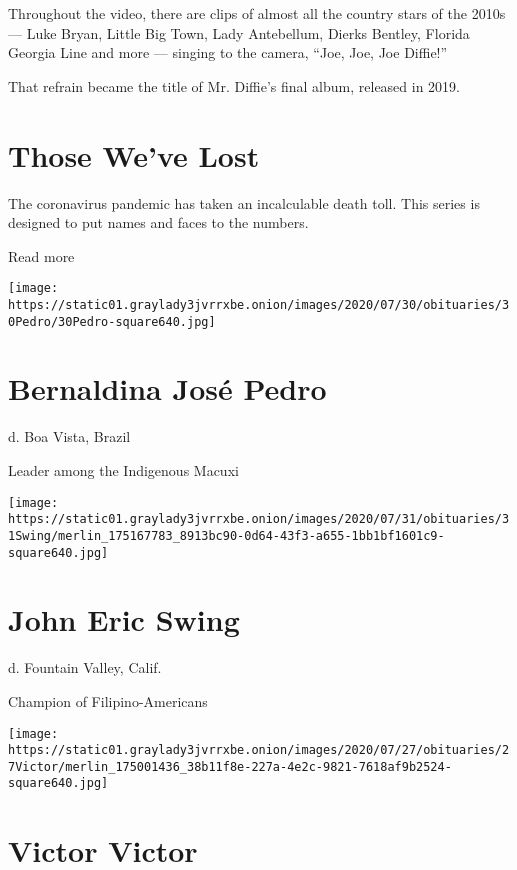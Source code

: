 Throughout the video, there are clips of almost all the country stars of
the 2010s --- Luke Bryan, Little Big Town, Lady Antebellum, Dierks
Bentley, Florida Georgia Line and more --- singing to the camera, ``Joe,
Joe, Joe Diffie!''

That refrain became the title of Mr. Diffie's final album, released in
2019.

\href{https://www.nytimes3xbfgragh.onion/interactive/2020/obituaries/people-died-coronavirus-obituaries.html?action=click\&pgtype=Article\&state=default\&region=BELOW_MAIN_CONTENT\&context=covid_obits_promo}{}

\hypertarget{those-weve-lost}{%
\section{Those We've Lost}\label{those-weve-lost}}

The coronavirus pandemic has taken an incalculable death toll. This
series is designed to put names and faces to the numbers.

Read more

\texttt{[image: https://static01.graylady3jvrrxbe.onion/images/2020/07/30/obituaries/30Pedro/30Pedro-square640.jpg]}

\hypertarget{bernaldina-josuxe9-pedro}{%
\section{Bernaldina José Pedro}\label{bernaldina-josuxe9-pedro}}

d. Boa Vista, Brazil

Leader among the Indigenous Macuxi

\texttt{[image: https://static01.graylady3jvrrxbe.onion/images/2020/07/31/obituaries/31Swing/merlin\_175167783\_8913bc90-0d64-43f3-a655-1bb1bf1601c9-square640.jpg]}

\hypertarget{john-eric-swing}{%
\section{John Eric Swing}\label{john-eric-swing}}

d. Fountain Valley, Calif.

Champion of Filipino-Americans

\texttt{[image: https://static01.graylady3jvrrxbe.onion/images/2020/07/27/obituaries/27Victor/merlin\_175001436\_38b11f8e-227a-4e2c-9821-7618af9b2524-square640.jpg]}

\hypertarget{victor-victor}{%
\section{Victor Victor}\label{victor-victor}}

